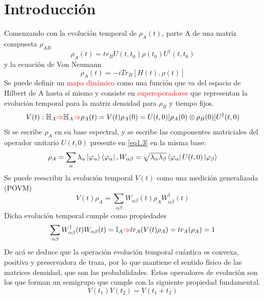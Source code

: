 \documentclass{book}
\begin{document}
\section{Introducción}
Comenzando con la evolución temporal de $\rho_A(t)$, parte A de una matriz compuesta $\rho_{AB}$
\begin{equation}\label{eq1.1}\rho_A(t)=tr_B{U(t,t_0)\rho(t_0)U^\dag(t,t_0)}\end{equation}
y la ecuación de Von Neumann 
\begin{equation}\label{eq1.2}\dot{\rho_A}(t)=-iTr_B[H(t),\rho(t)]\end{equation}
Se puede definir un \textcolor{Red}{mapa dinámico} como una función que va del espacio de Hilbert de A hasta sí mismo y consiste en \textcolor{Red}{superoperadores} que representan la evolución temporal para la matriz densidad para $\rho_B$ y tiempo fijos.
\begin{equation}\label{eq1.3}V(t):\mathbb{H}_A\textcolor{red}{\Rightarrow}\mathbb{H}_A\textcolor{red}{\Rightarrow} \rho_A(t)=V(t)\rho_A(0)=U(t,0)[\rho_A(0)\otimes\rho_B(0)]U^\dag(t,0) \end{equation}
Si se escribe $\rho_A$ en su base espectral, y se escribe las componentes matriciales del operador unitario $U(t,0)$ presente en \textcolor{blue}{\ref{eq1.3}} en la misma base:
\begin{equation}\label{eq1.4}\rho_A=\sum_\alpha\lambda_\alpha\ket{\varphi_\alpha}\bra{\varphi_\alpha}, W_{\alpha\beta}=\sqrt{\lambda_\alpha\lambda_\beta}\bra{\varphi_\alpha}U(t,0)\ket{\varphi_\beta}\end{equation}
Se puede reescribir la evolución temporal $V(t)$ como una medición generalizada (POVM)
\begin{equation}\label{eq1.5}V(t)\rho_A=\sum_{\alpha\beta}W_{\alpha\beta}(t)\rho_AW^\dag_{\alpha\beta}(t)\end{equation}
Dicha evolución temporal cumple como propiedades
\begin{equation}\label{eq1.6} \sum_{\alpha\beta}W_{\alpha\beta}^\dag(t)W_{\alpha\beta}(t)=\mathbb{I}_A\textcolor{red}{\Rightarrow} tr_A(V(t)\rho_A)=tr_A(\rho_A)=1\end{equation}
De acá se deduce que la operación evolución temporal cuántica es convexa, positiva y preservadora de traza, por lo que mantiene el sentido físico de las matrices densidad, que son las probabilidades. Estos operadores de evolución son los que forman un semigrupo que cumple con la siguiente propiedad fundamental.
\begin{equation}\label{eq1.7}V(t_1)V(t_2)=V(t_1+t_2) \end{equation}
\end{document}
